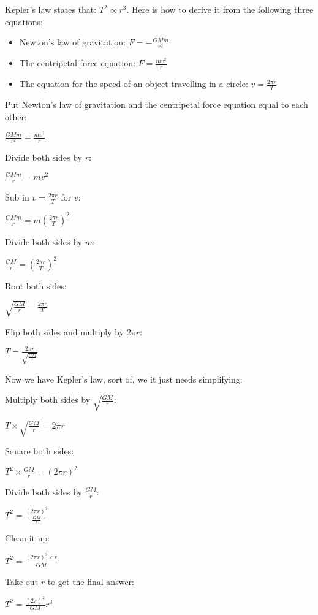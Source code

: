 \documentclass{article}
\begin{document}
Kepler's law states that: $T^2 \propto r^3$. Here is how to derive it from the
following three equations:

\begin{itemize}

\item Newton's law of gravitation: $F = -\frac{GMm}{r^2}$

\item The centripetal force equation: $F = \frac{mv^2}{r}$

\item The equation for the speed of an object travelling in a circle: 
$v = \frac{2 \pi r}{T}$

\end{itemize}


Put Newton's law of gravitation and the centripetal force equation equal to each
other:

$\frac{GMm}{r^2} = \frac{mv^2}{r}$

Divide both sides by $r$:

$\frac{GMm}{r} = mv^2$

Sub in $v = \frac{2 \pi r}{T}$ for $v$:

$\frac{GMm}{r} = m(\frac{2 \pi r}{T})^2$

Divide both sides by $m$:

$\frac{GM}{r} = (\frac{2 \pi r}{T})^2$

Root both sides:

$\sqrt{\frac{GM}{r}} = \frac{2 \pi r}{T}$

Flip both sides and multiply by $2 \pi r$:

$T = \frac{2 \pi r}{\sqrt{\frac{GM}{r}}}$

Now we have Kepler's law, sort of, we it just needs simplifying:

Multiply both sides by $\sqrt{\frac{GM}{r}}$:

$T \times \sqrt{\frac{GM}{r}} = 2 \pi r$

Square both sides:

$T^2 \times \frac{GM}{r} = (2 \pi r)^2$

Divide both sides by $\frac{GM}{r}$:

$T^2 = \frac{(2 \pi r)^2}{\frac{GM}{r}}$

Clean it up:

$T^2 = \frac{(2 \pi r)^2 \times r}{GM}$

Take out $r$ to get the final answer:

$T^2 = \frac{(2 \pi)^2}{GM}r^3$
\end{document}
